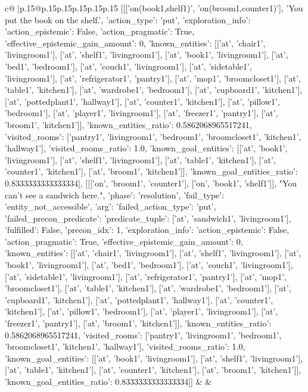 \documentclass{article}
\begin{document}
{\begin{supertabular}{c@{$\;$}|p{.15\linewidth}@{}p{.15\linewidth}p{.15\linewidth}p{.15\linewidth}p{.15\linewidth}p{.15\linewidth}}
{{{	 [[['on(book1,shelf1)', 'on(broom1,counter1)'], 'You put the book on the shelf.', {'action_type': 'put', 'exploration_info': {'action_epistemic': False, 'action_pragmatic': True, 'effective_epistemic_gain_amount': 0, 'known_entities': [['at', 'chair1', 'livingroom1'], ['at', 'shelf1', 'livingroom1'], ['at', 'book1', 'livingroom1'], ['at', 'bed1', 'bedroom1'], ['at', 'couch1', 'livingroom1'], ['at', 'sidetable1', 'livingroom1'], ['at', 'refrigerator1', 'pantry1'], ['at', 'mop1', 'broomcloset1'], ['at', 'table1', 'kitchen1'], ['at', 'wardrobe1', 'bedroom1'], ['at', 'cupboard1', 'kitchen1'], ['at', 'pottedplant1', 'hallway1'], ['at', 'counter1', 'kitchen1'], ['at', 'pillow1', 'bedroom1'], ['at', 'player1', 'livingroom1'], ['at', 'freezer1', 'pantry1'], ['at', 'broom1', 'kitchen1']], 'known_entities_ratio': 0.5862068965517241, 'visited_rooms': ['pantry1', 'livingroom1', 'bedroom1', 'broomcloset1', 'kitchen1', 'hallway1'], 'visited_rooms_ratio': 1.0, 'known_goal_entities': [['at', 'book1', 'livingroom1'], ['at', 'shelf1', 'livingroom1'], ['at', 'table1', 'kitchen1'], ['at', 'counter1', 'kitchen1'], ['at', 'broom1', 'kitchen1']], 'known_goal_entities_ratio': 0.8333333333333334}}], [[['on', 'broom1', 'counter1'], ['on', 'book1', 'shelf1']], "You can't see a sandwich here.", {'phase': 'resolution', 'fail_type': 'entity_not_accessible', 'arg': {'failed_action_type': 'put', 'failed_precon_predicate': {'predicate_tuple': ['at', 'sandwich1', 'livingroom1'], 'fulfilled': False, 'precon_idx': 1}}, 'exploration_info': {'action_epistemic': False, 'action_pragmatic': True, 'effective_epistemic_gain_amount': 0, 'known_entities': [['at', 'chair1', 'livingroom1'], ['at', 'shelf1', 'livingroom1'], ['at', 'book1', 'livingroom1'], ['at', 'bed1', 'bedroom1'], ['at', 'couch1', 'livingroom1'], ['at', 'sidetable1', 'livingroom1'], ['at', 'refrigerator1', 'pantry1'], ['at', 'mop1', 'broomcloset1'], ['at', 'table1', 'kitchen1'], ['at', 'wardrobe1', 'bedroom1'], ['at', 'cupboard1', 'kitchen1'], ['at', 'pottedplant1', 'hallway1'], ['at', 'counter1', 'kitchen1'], ['at', 'pillow1', 'bedroom1'], ['at', 'player1', 'livingroom1'], ['at', 'freezer1', 'pantry1'], ['at', 'broom1', 'kitchen1']], 'known_entities_ratio': 0.5862068965517241, 'visited_rooms': ['pantry1', 'livingroom1', 'bedroom1', 'broomcloset1', 'kitchen1', 'hallway1'], 'visited_rooms_ratio': 1.0, 'known_goal_entities': [['at', 'book1', 'livingroom1'], ['at', 'shelf1', 'livingroom1'], ['at', 'table1', 'kitchen1'], ['at', 'counter1', 'kitchen1'], ['at', 'broom1', 'kitchen1']], 'known_goal_entities_ratio': 0.8333333333333334}}]] 
	  } 
	   } 
	   } 
	 & & \\ 
 


\end{supertabular}}
\end{document}

